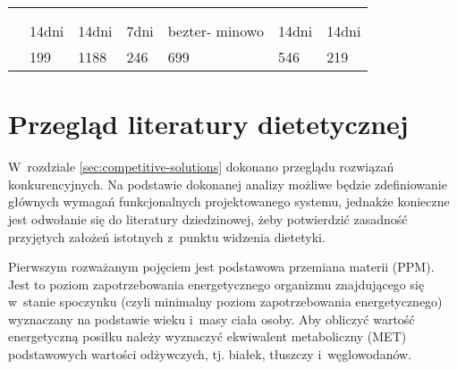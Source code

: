 \begin{minipage}{\textwidth}
\begin{table}[H]
\begin{tabular}{|P{.22\textwidth}|P{.09\textwidth}|P{.09\textwidth}|P{.09\textwidth}|P{.09\textwidth}|P{.09\textwidth}|P{.09\textwidth}|}
                                      &        &            &            &              &          &          \\ \hline
                                       &        &            &              &              &          &        \\ \hline
                   &        &            &            &              &          &        \\ \hline
                                                & 14dni                 & 14dni                     & 7dni                      & bezter- minowo            & 14dni                 & 14dni                 \\ \hline
                                           & 199                   & 1188                      & 246                       & 699                       & 546                   & 219                   \\ \hline
        \end{tabular}
    \end{table}
\end{minipage}

\section{Przegląd literatury dietetycznej}\label{sec:domain-literature}

W~rozdziale \ref{sec:competitive-solutions} dokonano przeglądu rozwiązań konkurencyjnych.
Na podstawie dokonanej analizy możliwe będzie zdefiniowanie głównych wymagań funkcjonalnych projektowanego systemu,
jednakże konieczne jest odwołanie się do literatury dziedzinowej, żeby potwierdzić zasadność przyjętych założeń istotnych z~punktu widzenia dietetyki.

\par
Pierwszym rozważanym pojęciem jest podstawowa przemiana materii (PPM).
Jest to poziom zapotrzebowania energetycznego organizmu znajdującego się w~stanie spoczynku (czyli minimalny poziom zapotrzebowania energetycznego)
wyznaczany na podstawie wieku i~masy ciała osoby.
Aby obliczyć wartość energetyczną posiłku należy wyznaczyć ekwiwalent metaboliczny (MET) podstawowych wartości odżywczych,
tj. białek, tłuszczy i~węglowodanów\cite{book:dietetyka-zywienie-zdrowego-i-chorego-czlowieka}.

